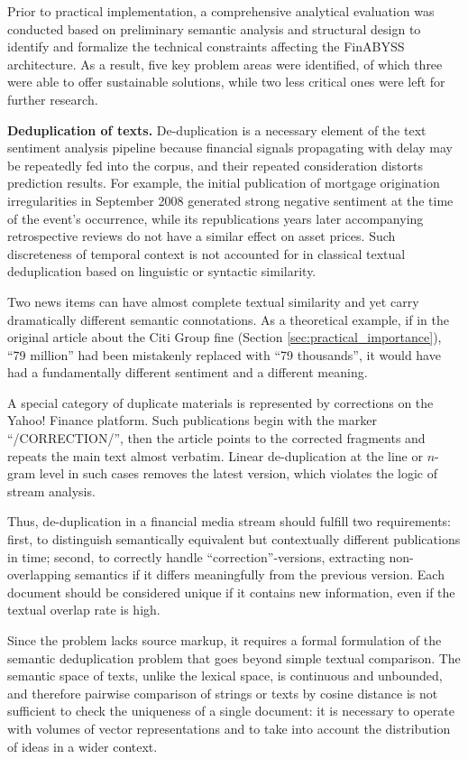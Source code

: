 Prior to practical implementation, a comprehensive analytical evaluation was conducted
based on preliminary semantic analysis and structural design to identify and formalize
the technical constraints affecting the FinABYSS architecture. As a result, five key
problem areas were identified, of which three were able to offer sustainable solutions,
while two less critical ones were left for further research.

\textbf{Deduplication of texts.} De-duplication is a necessary element of the text sentiment
analysis pipeline because financial signals propagating with delay may be repeatedly fed
into the corpus, and their repeated consideration distorts prediction results. For example,
the initial publication of mortgage origination irregularities in September 2008 generated
strong negative sentiment at the time of the event's occurrence, while its republications
years later accompanying retrospective reviews do not have a similar effect on asset prices.
Such discreteness of temporal context is not accounted for in classical textual deduplication
based on linguistic or syntactic similarity.

Two news items can have almost complete textual similarity and yet carry dramatically different
semantic connotations. As a theoretical example, if in the original article about the Citi Group
fine (Section \ref{sec:practical_importance}), “79 million” had been mistakenly replaced with
“79 thousands”, it would have had a fundamentally different sentiment and a different meaning.

A special category of duplicate materials is represented by corrections on the Yahoo! Finance
platform. Such publications begin with the marker “/CORRECTION/”, then the article points
to the corrected fragments and repeats the main text almost verbatim. Linear de-duplication
at the line or $n$-gram level in such cases removes the latest version, which violates
the logic of stream analysis.

Thus, de-duplication in a financial media stream should fulfill two requirements: first,
to distinguish semantically equivalent but contextually different publications in time;
second, to correctly handle “correction”-versions, extracting non-overlapping semantics
if it differs meaningfully from the previous version. Each document should be considered
unique if it contains new information, even if the textual overlap rate is high.

Since the problem lacks source markup, it requires a formal formulation of the semantic
deduplication problem that goes beyond simple textual comparison. The semantic space
of texts, unlike the lexical space, is continuous and unbounded, and therefore pairwise
comparison of strings or texts by cosine distance is not sufficient to check the uniqueness
of a single document: it is necessary to operate with volumes of vector representations and
to take into account the distribution of ideas in a wider context.

